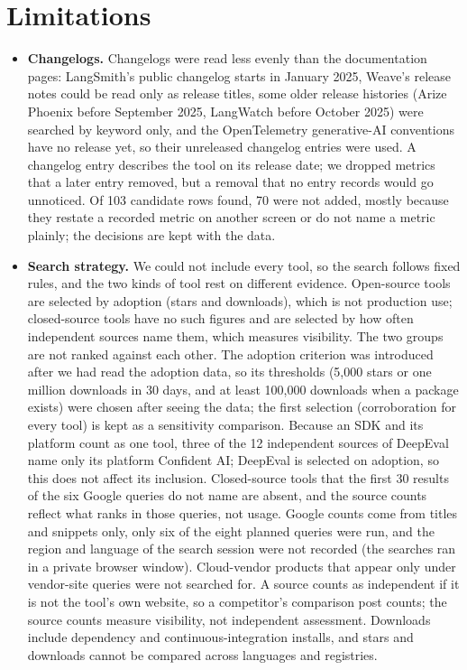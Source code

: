 \documentclass[conference]{IEEEtran}
\begin{document}
\section{Limitations}\label{sec:limits}
\begin{itemize}
  \item \textbf{Changelogs.} Changelogs were read less evenly than the documentation pages: LangSmith's public changelog starts in January 2025, Weave's release notes could be read only as release titles, some older release histories (Arize Phoenix before September 2025, LangWatch before October 2025) were searched by keyword only, and the OpenTelemetry generative-AI conventions have no release yet, so their unreleased changelog entries were used. A changelog entry describes the tool on its release date; we dropped metrics that a later entry removed, but a removal that no entry records would go unnoticed. Of 103 candidate rows found, 70 were not added, mostly because they restate a recorded metric on another screen or do not name a metric plainly; the decisions are kept with the data.
  \item \textbf{Search strategy.} We could not include every tool, so the search follows fixed rules, and the two kinds of tool rest on different evidence. Open-source tools are selected by adoption (stars and downloads), which is not production use; closed-source tools have no such figures and are selected by how often independent sources name them, which measures visibility. The two groups are not ranked against each other. The adoption criterion was introduced after we had read the adoption data, so its thresholds (5,000 stars or one million downloads in 30 days, and at least 100,000 downloads when a package exists) were chosen after seeing the data; the first selection (corroboration for every tool) is kept as a sensitivity comparison. Because an SDK and its platform count as one tool, three of the 12 independent sources of DeepEval name only its platform Confident AI; DeepEval is selected on adoption, so this does not affect its inclusion. Closed-source tools that the first 30 results of the six Google queries do not name are absent, and the source counts reflect what ranks in those queries, not usage. Google counts come from titles and snippets only, only six of the eight planned queries were run, and the region and language of the search session were not recorded (the searches ran in a private browser window). Cloud-vendor products that appear only under vendor-site queries were not searched for. A source counts as independent if it is not the tool's own website, so a competitor's comparison post counts; the source counts measure visibility, not independent assessment. Downloads include dependency and continuous-integration installs, and stars and downloads cannot be compared across languages and registries.

\end{itemize}
\end{document}
